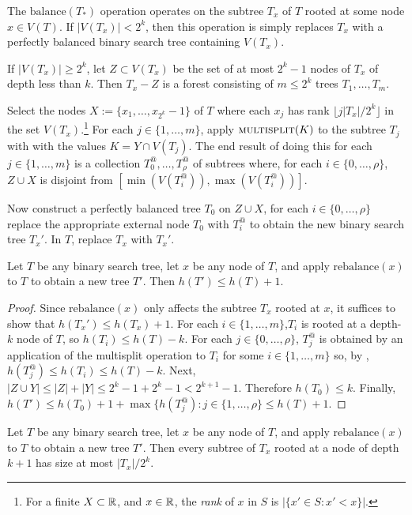 \documentclass[kpfonts]{patmorin}
\begin{document}
The $\mathrm{balance}(T_*)$ operation operates on the subtree $T_x$ of $T$ rooted at some node $x\in V(T)$.  If $|V(T_x)|< 2^k$, then this operation is simply replaces $T_x$ with a perfectly balanced binary search tree containing $V(T_x)$.  

If $|V(T_x)|\ge 2^k$, let $Z\subset V(T_x)$ be the set of at most $2^k-1$ nodes of $T_x$ of depth less than $k$.  Then $T_x-Z$ is a forest consisting of $m\le 2^{k}$ trees $T_1,\ldots,T_m$.  

Select the nodes $X:=\{x_1,\ldots,x_{2^k}-1\}$ of $T$ where each $x_j$ has rank $\lfloor j|T_x|/2^k\rfloor$ in the set $V(T_x)$.\footnote{For a finite $X\subset\mathbb{R}$, and $x\in\mathbb{R}$, the \emph{rank} of $x$ in $S$ is $|\{x'\in S: x'<x\}|$.}  For each $j\in\{1,\ldots,m\}$, apply $\textsc{multisplit}(K)$ to the subtree $T_j$ with with the values $K=Y\cap V(T_j)$.  The end result of doing this for each $j\in\{1,\ldots,m\}$ is a collection $T^@_0,\ldots,T^@_\rho$ of subtrees where, for each $i\in\{0,\ldots,\rho\}$, $Z\cup X$ is disjoint from $[\min(V(T^@_i)), \max(V(T^@_i))]$.

Now construct a perfectly balanced tree $T_0$ on $Z\cup X$, for each $i\in\{0,\ldots,\rho\}$ replace the appropriate external node $T_0$ with $T^@_i$ to obtain the new binary search tree $T_x'$.  In $T$, replace $T_x$ with $T_x'$.

\begin{lem}
  Let $T$ be any binary search tree, let $x$ be any node of $T$, and apply $\mathrm{rebalance}(x)$ to $T$ to obtain a new tree $T'$.  Then $h(T')\le h(T)+1$.
\end{lem}

\begin{proof}
  Since $\mathrm{rebalance}(x)$ only affects the subtree $T_x$ rooted at $x$, it suffices to show that $h(T_x')\le h(T_x)+1$.  For each $i\in\{1,\ldots, m\}$,$T_i$ is rooted at a depth-$k$ node of $T$, so $h(T_i)\le h(T)-k$. For each $j\in\{0,\ldots,\rho\}$, $T^@_j$ is obtained by an application of the multisplit operation to $T_i$ for some $i\in\{1,\ldots,m\}$ so, by , $h(T^@_j)\le h(T_i)\le h(T)-k$.  Next, $|Z\cup Y|\le |Z|+|Y| \le 2^k-1 + 2^k-1 < 2^{k+1}-1$.  Therefore $h(T_0)\le k$.  Finally, $h(T')\le h(T_0)+1 +\max\{h(T^@_j):j\in\{1,\ldots,\rho\} \le h(T)+1$.  
\end{proof}

\begin{lem}
  Let $T$ be any binary search tree, let $x$ be any node of $T$, and apply $\mathrm{rebalance}(x)$ to $T$ to obtain a new tree $T'$.  Then every subtree of $T_x$ rooted at a node of depth $k+1$ has size at most $|T_x|/2^k$.
\end{lem}
\end{document}
